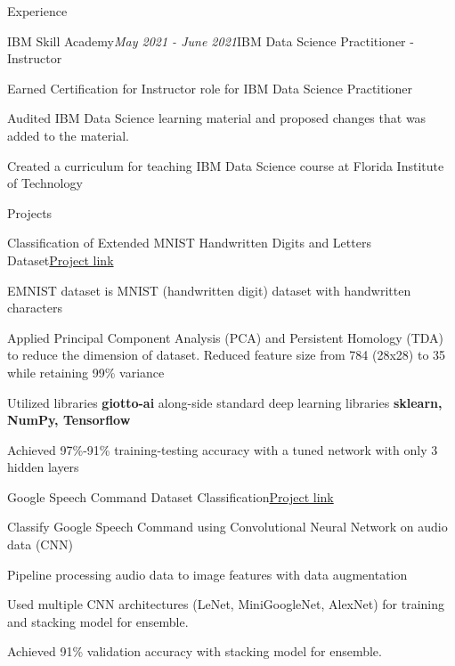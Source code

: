 \documentclass{resume} %
\begin{document}
\begin{rSection}{Experience}
    \begin{rSubsection}{IBM Skill Academy}{\em May 2021 - June 2021}{IBM Data Science Practitioner - Instructor}{}
        \item Earned Certification for Instructor role for IBM Data Science Practitioner
        \item Audited IBM Data Science learning material and proposed changes that was added to the material.
        \item Created a curriculum for teaching IBM Data Science course at Florida Institute of Technology
    \end{rSubsection}
    

\end{rSection}

\begin{rSection}{Projects}
    \begin{rSubsection}{Classification of Extended MNIST Handwritten Digits and Letters Dataset}{}{\href{https://colab.research.google.com/drive/18z161k3diYO6sNVBfiKH8uGqbrekxMPN?usp=sharing}{Project link}}{}
        \item EMNIST dataset is MNIST (handwritten digit) dataset with handwritten characters
        \item Applied Principal Component Analysis (PCA) and Persistent Homology (TDA) to reduce the dimension of dataset. Reduced feature size from 784 (28x28) to 35 while retaining 99\% variance
        \item Utilized libraries \textbf{giotto-ai} along-side standard deep learning libraries \textbf{sklearn, NumPy, Tensorflow}
        \item Achieved 97\%-91\% training-testing accuracy with a tuned network with only 3 hidden layers
    \end{rSubsection}

    \begin{rSubsection}{Google Speech Command Dataset Classification}{}{\href{https://colab.research.google.com/drive/1KCJjwgW6VDlANLmXYTotatk2xux3nw0N?usp=sharing}{Project link}}{}
        \item Classify Google Speech Command using Convolutional Neural Network on audio data (CNN)
        \item Pipeline processing audio data to image features with data augmentation
        \item Used multiple CNN architectures (LeNet, MiniGoogleNet, AlexNet) for training and stacking model for ensemble.
        \item Achieved 91\% validation accuracy with stacking model for ensemble.
    \end{rSubsection}


\end{rSection}
\end{document}
